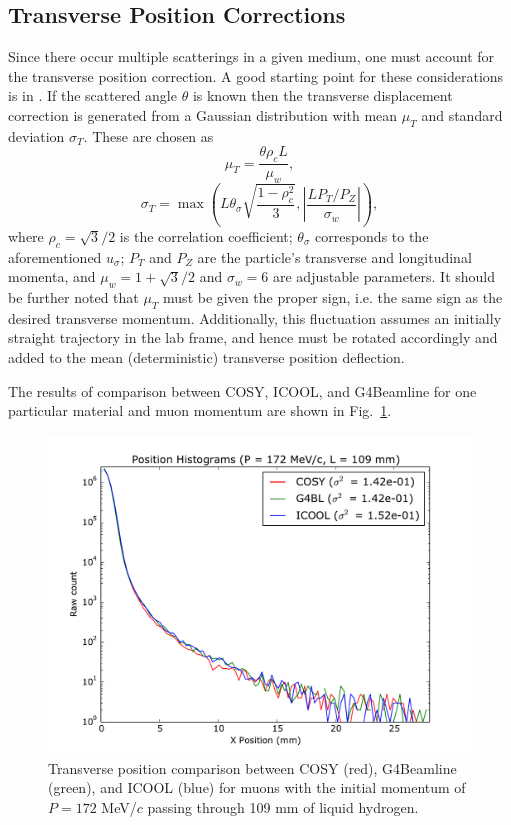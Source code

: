 \documentclass[a4paper,11pt]{article}
\begin{document}
\subsection{Transverse Position Corrections}
Since there occur multiple scatterings in a given medium, one must account for the transverse position correction. A good starting point for these considerations is in \cite{PDG}. If the scattered angle $\theta$ is known then the transverse displacement correction is generated from a Gaussian distribution with mean $\mu_T$ and standard deviation $\sigma_T$. These are chosen as 
\[
\mu_T = \frac{\theta \rho_c L}{\mu_w},
\]
\[
\sigma_T = \max\left(L \theta_\sigma \sqrt{\frac{1-\rho_c^2}{3}},\left|\frac{L P_T / P_Z}{\sigma_w}\right|\right),
\]
where $\rho_c = \sqrt{3}/2$ is the correlation coefficient; $\theta_\sigma$ corresponds to the aforementioned $u_\sigma$; $P_T$ and $P_Z$ are the particle's transverse and longitudinal momenta, and $\mu_w=1+\sqrt{3}/2$ and $\sigma_w=6$ are adjustable parameters. It should be further noted that $\mu_T$ must be given the proper sign, i.e. the same sign as the desired transverse momentum. Additionally, this fluctuation assumes an initially straight trajectory in the lab frame, and hence must be rotated accordingly and added to the mean (deterministic) transverse position deflection.

The results of comparison between COSY, ICOOL, and G4Beamline for one particular material and muon momentum are shown in Fig.~\ref{fig:transverse}.

\begin{figure}[htb]
\centering
\includegraphics[width=\columnwidth]{Figures/transverse.pdf}
\caption{Transverse position comparison between COSY (red), G4Beamline (green), and ICOOL (blue) for muons with the initial momentum of $P=172$ MeV/$c$ passing through 109 mm of liquid hydrogen.}
\label{fig:transverse}
\end{figure}
\end{document}
